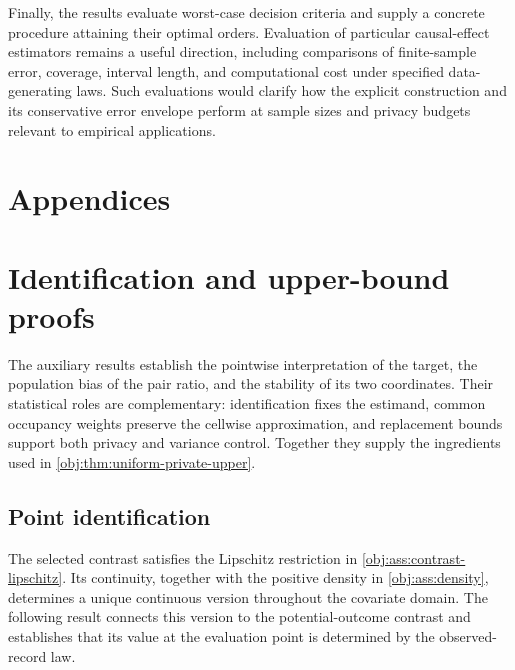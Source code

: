 \documentclass[11pt]{article}
\begin{document}
Finally, the results evaluate worst-case decision criteria and supply a concrete procedure attaining their optimal orders. Evaluation of particular causal-effect estimators remains a useful direction, including comparisons of finite-sample error, coverage, interval length, and computational cost under specified data-generating laws. Such evaluations would clarify how the explicit construction and its conservative error envelope perform at sample sizes and privacy budgets relevant to empirical applications.


\appendix

\section*{Appendices}

\section{Identification and upper-bound proofs}

The auxiliary results establish the pointwise interpretation of the target, the population bias of the pair ratio, and the stability of its two coordinates. Their statistical roles are complementary: identification fixes the estimand, common occupancy weights preserve the cellwise approximation, and replacement bounds support both privacy and variance control. Together they supply the ingredients used in \cref{obj:thm:uniform-private-upper}.

\subsection{Point identification}

The selected contrast satisfies the Lipschitz restriction in \cref{obj:ass:contrast-lipschitz}. Its continuity, together with the positive density in \cref{obj:ass:density}, determines a unique continuous version throughout the covariate domain. The following result connects this version to the potential-outcome contrast and establishes that its value at the evaluation point is determined by the observed-record law.
\end{document}
